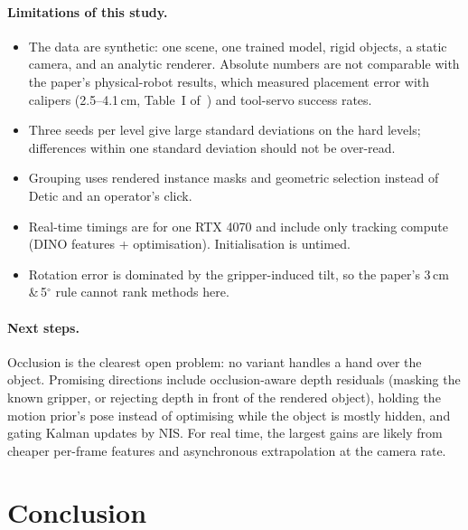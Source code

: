 \documentclass[10pt,a4paper]{article}
\begin{document}
\paragraph{Limitations of this study.}
\begin{itemize}
  \item The data are synthetic: one scene, one trained model, rigid objects, a
        static camera, and an analytic renderer. Absolute numbers are not
        comparable with the paper's physical-robot results, which measured
        placement error with calipers (2.5--4.1\,cm, Table~I of~\cite{pogs}) and
        tool-servo success rates.
  \item Three seeds per level give large standard deviations on the hard levels;
        differences within one standard deviation should not be over-read.
  \item Grouping uses rendered instance masks and geometric selection instead of
        Detic and an operator's click.
  \item Real-time timings are for one RTX 4070 and include only tracking compute
        (DINO features + optimisation). Initialisation is untimed.
  \item Rotation error is dominated by the gripper-induced tilt, so the paper's
        3\,cm\,\&\,5$^\circ$ rule cannot rank methods here.
\end{itemize}

\paragraph{Next steps.} Occlusion is the clearest open problem: no variant
handles a hand over the object. Promising directions include
occlusion-aware depth residuals (masking the known gripper, or rejecting depth
in front of the rendered object), holding the motion prior's pose instead of
optimising while the object is mostly hidden, and gating Kalman updates by NIS.
For real time, the largest gains are likely from cheaper per-frame features and
asynchronous extrapolation at the camera rate.

\section{Conclusion}
\end{document}
